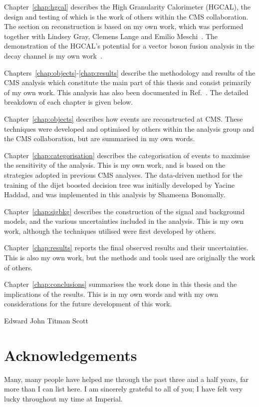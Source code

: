 Chapter~\ref{chap:hgcal} describes the High Granularity Calorimeter (HGCAL), 
the design and testing of which is the work of others within the CMS collaboration. 
The section on reconstruction is based on my own work, 
which was performed together with Lindsey Gray, Clemens Lange and Emilio Meschi~\cite{ClusteringConf}.
The demonstration of the HGCAL's potential for a vector boson fusion analysis 
in the \Hgg decay channel is my own work~\cite{HGCAL}.

Chapters~\ref{chap:objects}-\ref{chap:results} describe the methodology and results of the CMS \Hgg analysis
which constitute the main part of this thesis and consist primarily of my own work.
This analysis has also been documented in Ref.~\cite{HIG-18-029}.
The detailed breakdown of each chapter is given below.

Chapter~\ref{chap:objects} describes how events are reconstructed at CMS.
These techniques were developed and optimised by others within the \Hgg analysis group 
and the CMS collaboration, but are summarised in my own words.

Chapter~\ref{chap:categorisation} describes the categorisation of events 
to maximise the sensitivity of the analysis.
This is my own work, and is based on the strategies adopted in previous CMS \Hgg analyses.
The data-driven method for the training of the dijet boosted decision tree 
was initially developed by Yacine Haddad, and was implemented in this analysis by Shameena Bonomally.

Chapter~\ref{chap:sigbkg} describes the construction of the signal and background models, 
and the various uncertainties included in the analysis.
This is my own work, although the techniques utilised were first developed by others.

Chapter~\ref{chap:results} reports the final observed results and their uncertainties.
This is also my own work, but the methods and tools used are originally the work of others.

Chapter~\ref{chap:conclusions} summarises the work done in this thesis 
and the implications of the results.
This is in my own words and with my own considerations for the future development of this work.

\begin{flushright}
    Edward John Titman Scott
\end{flushright}


\chapter*{\centering Acknowledgements}
Many, many people have helped me through the past three and a half years, 
far more than I can list here.
I am sincerely grateful to all of you; I have felt very lucky throughout my time at Imperial.

